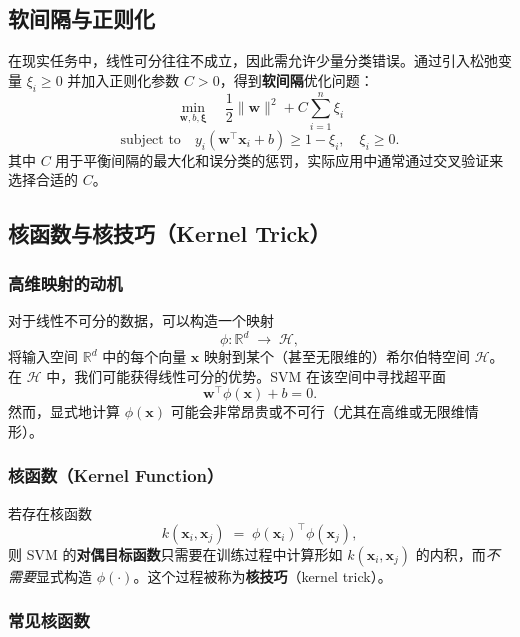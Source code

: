 \documentclass[11pt]{article}
\begin{document}
\begin{CJK}{UTF8}{gbsn}
\subsection{软间隔与正则化}

在现实任务中，线性可分往往不成立，因此需允许少量分类错误。通过引入松弛变量 \(\xi_i \ge 0\) 并加入正则化参数 \(C>0\)，得到\textbf{软间隔}优化问题：
\[
\min_{\mathbf{w}, b, \boldsymbol{\xi}} \quad \frac{1}{2}\|\mathbf{w}\|^2 + C \sum_{i=1}^n \xi_i
\]
\[
\text{subject\ to} \quad y_i(\mathbf{w}^\top \mathbf{x}_i + b) \ge 1 - \xi_i, \quad \xi_i \ge 0.
\]
其中 \(C\) 用于平衡间隔的最大化和误分类的惩罚，实际应用中通常通过交叉验证来选择合适的 \(C\)。

\subsection{核函数与核技巧（Kernel Trick）}
\label{sec:kernel}

\subsubsection{高维映射的动机}

对于线性不可分的数据，可以构造一个映射
\[
\phi: \mathbb{R}^d \;\to\; \mathcal{H},
\]
将输入空间 \(\mathbb{R}^d\) 中的每个向量 \(\mathbf{x}\) 映射到某个（甚至无限维的）希尔伯特空间 \(\mathcal{H}\)。在 \(\mathcal{H}\) 中，我们可能获得线性可分的优势。SVM 在该空间中寻找超平面
\[
\mathbf{w}^\top \phi(\mathbf{x}) + b = 0.
\]
然而，显式地计算 \(\phi(\mathbf{x})\) 可能会非常昂贵或不可行（尤其在高维或无限维情形）。

\subsubsection{核函数（Kernel Function）}

若存在核函数
\[
k(\mathbf{x}_i, \mathbf{x}_j) \;=\; \phi(\mathbf{x}_i)^\top \phi(\mathbf{x}_j),
\]
则 SVM 的\textbf{对偶目标函数}只需要在训练过程中计算形如 \(k(\mathbf{x}_i, \mathbf{x}_j)\) 的内积，而\textit{不需要}显式构造 \(\phi(\cdot)\)。这个过程被称为\textbf{核技巧}（kernel trick）。

\subsubsection{常见核函数}


\end{CJK}
\end{document}
